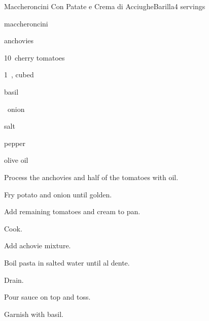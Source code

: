 \begin{recipe}{Maccheroncini Con Patate e Crema di Acciughe}{Barilla}{4 servings}

\begin{ingredients}
\item {} maccheroncini
\item {} anchovies
\item 10~cherry tomatoes
\item 1~, cubed
\item basil
\item {} 
\item \half~onion
\item salt
\item pepper
\item olive oil
\end{ingredients}

\begin{directions}
\item Process the anchovies and half of the tomatoes with oil.
\item Fry potato and onion until golden.
\item Add remaining tomatoes and cream to pan.
\item Cook.
\item Add achovie mixture.
\item Boil pasta in salted water until al dente.
\item Drain.
\item Pour sauce on top and toss.
\item Garnish with basil.
\end{directions}

\end{recipe}
